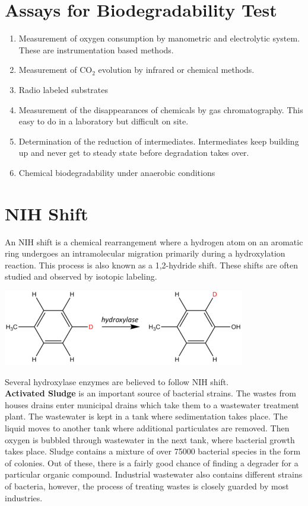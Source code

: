 \documentclass[pdftex,11pt,a4paper]{article}
\begin{document}
\section*{Assays for Biodegradability Test}
\begin{enumerate}
\item Measurement of oxygen consumption by manometric and electrolytic system. These are instrumentation based methods.
\item Measurement of CO$_2$ evolution by infrared or chemical methods.
\item Radio labeled substrates
\item Measurement of the disappearances of chemicals by gas chromatography. This easy to do in a laboratory but difficult on site.
\item Determination of the reduction of intermediates. Intermediates keep building up and never get to steady state before degradation takes over.
\item Chemical biodegradability under anaerobic conditions
\end{enumerate}
\section*{NIH Shift}
An NIH shift is a chemical rearrangement where a hydrogen atom on an aromatic ring undergoes an intramolecular migration primarily during a hydroxylation reaction. This process is also known as a 1,2-hydride shift. These shifts are often studied and observed by isotopic labeling.
\begin{center}
\includegraphics{nih.png}
\end{center}
Several hydroxylase enzymes are believed to follow NIH shift.\\

\textbf{Activated Sludge} is an important source of bacterial strains. The wastes from houses drains enter municipal drains which take them to a wastewater treatment plant. The wastewater is kept in a tank where sedimentation takes place. The liquid moves to another tank where additional particulates are removed. Then oxygen is bubbled through wastewater in the next tank, where bacterial growth takes place. Sludge contains a mixture of over 75000 bacterial species in the form of colonies. Out of these, there is a fairly good chance of finding a degrader for a particular organic compound. Industrial wastewater also contains different strains of bacteria, however, the process of treating wastes is closely guarded by most industries.\\
\end{document}
